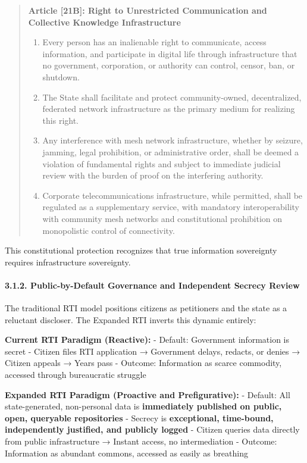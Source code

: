 \begin{quote}
\textbf{Article {[}21B{]}: Right to Unrestricted Communication and
Collective Knowledge Infrastructure}

\begin{enumerate}
\def\labelenumi{(\arabic{enumi})}
\item
  Every person has an inalienable right to communicate, access
  information, and participate in digital life through infrastructure
  that no government, corporation, or authority can control, censor,
  ban, or shutdown.
\item
  The State shall facilitate and protect community-owned, decentralized,
  federated network infrastructure as the primary medium for realizing
  this right.
\item
  Any interference with mesh network infrastructure, whether by seizure,
  jamming, legal prohibition, or administrative order, shall be deemed a
  violation of fundamental rights and subject to immediate judicial
  review with the burden of proof on the interfering authority.
\item
  Corporate telecommunications infrastructure, while permitted, shall be
  regulated as a supplementary service, with mandatory interoperability
  with community mesh networks and constitutional prohibition on
  monopolistic control of connectivity.
\end{enumerate}
\end{quote}

This constitutional protection recognizes that true information
sovereignty requires infrastructure sovereignty.

\paragraph{3.1.2. Public-by-Default Governance and Independent Secrecy
Review}\label{public-by-default-governance-and-independent-secrecy-review}

The traditional RTI model positions citizens as petitioners and the
state as a reluctant discloser. The Expanded RTI inverts this dynamic
entirely:

\textbf{Current RTI Paradigm (Reactive):} - Default: Government
information is secret - Citizen files RTI application → Government
delays, redacts, or denies → Citizen appeals → Years pass - Outcome:
Information as scarce commodity, accessed through bureaucratic struggle

\textbf{Expanded RTI Paradigm (Proactive and Prefigurative):} - Default:
All state-generated, non-personal data is \textbf{immediately published
on public, open, queryable repositories} - Secrecy is
\textbf{exceptional, time-bound, independently justified, and publicly
logged} - Citizen queries data directly from public infrastructure →
Instant access, no intermediation - Outcome: Information as abundant
commons, accessed as easily as breathing

